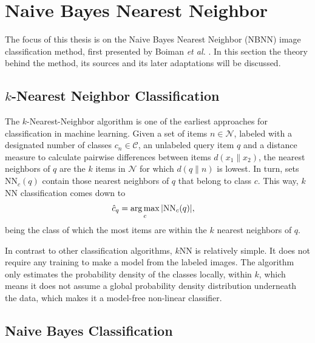\chapter{Naive Bayes Nearest Neighbor} %
\label{cha:naive_bayes_nearest_neighbor}

The focus of this thesis is on the Naive Bayes Nearest Neighbor (NBNN) image classification method, first presented by Boiman \emph{et al.} \cite{boiman2008defense}. In this section the theory behind the method, its sources and its later adaptations will be discussed.

\section{$k$-Nearest Neighbor Classification} %
\label{sub:_k_nearest_neighbor}

The $k$-Nearest-Neighbor algorithm is one of the earliest approaches for classification in machine learning. Given a set of items $n \in \mathcal{N}$, labeled with a designated number of classes $c_n \in \mathcal{C}$, an unlabeled query item $q$ and a distance measure to calculate pairwise differences between items $d(x_1\|x_2)$, the nearest neighbors of $q$ are the $k$ items in $\mathcal{N}$ for which $d(q\|n)$ is lowest. In turn, sets $\text{NN}_c(q)$ contain those nearest neighbors of $q$ that belong to class $c$. This way, $k$NN classification comes down to
\begin{align}
    \hat c_q &= \operatorname*{arg\,max}_c |\text{NN}_c(q)|,
\end{align}
being the class of which the most items are within the $k$ nearest neighbors of $q$.

In contrast to other classification algorithms, $k$NN is relatively simple. It does not require any training to make a model from the labeled images. The algorithm only estimates the probability density of the classes locally, within $k$, which means it does not assume a global probability density distribution underneath the data, which makes it a model-free non-linear classifier.

\section{Naive Bayes Classification} %
\label{sub:NB}

